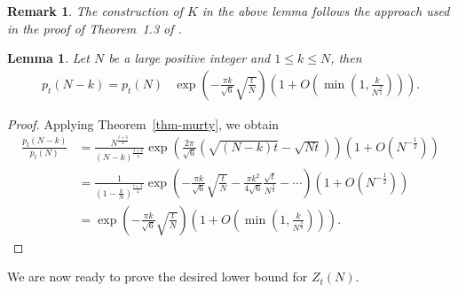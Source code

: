 \documentclass[11pt]{amsart}
\theoremstyle{plain}
\newtheorem{lemma}[theorem]{Lemma}
\newtheorem{remark}[]{Remark}
\numberwithin{equation}{section}
\begin{document}
	\begin{remark}
		The construction of $K$ in the above lemma follows the approach used in the proof of Theorem~1.3 of \cite{barman1}.
	\end{remark}
	\begin{lemma}\label{lemma-erdos0}
		Let $N$ be a large positive integer and $1\le k\le N$, then 
		\begin{align*}
			p_t(N-k)=p_t(N)&\exp\left(-\frac{\pi k}{\sqrt{6}}\sqrt{\frac{t}{N}}\right)\left(1+O\left(\min\left(1,\frac{k}{N^{\frac{3}{4}}}\right)\right)\right). 
		\end{align*}
	\end{lemma}
	\begin{proof}
		Applying Theorem~\ref{thm-murty}, we obtain
		\begin{align*}
			\frac{p_t(N-k)}{p_t(N)}&=\frac{N^{\frac{t+3}{4}}}{(N-k)^{\frac{t+3}{4}}}\exp\left(\frac{2\pi}{\sqrt{6}}\left(\sqrt{(N-k)t}-\sqrt{Nt}\right)\right)\left(1+O\left(N^{-\frac{1}{2}}\right)\right)  \\
			&=\frac{1}{\left(1-\frac{k}{N}\right)^{\frac{t+3}{4}}}\exp\left(-\frac{\pi k}{\sqrt{6}}\sqrt{\frac{t}{N}}-\frac{\pi k^{2}}{4\sqrt{6}}\frac{\sqrt{t}}{N^{\frac{3}{2}}}-\cdots\right)\left(1+O\left(N^{-\frac{1}{2}}\right)\right)\\
			&=\exp\left(-\frac{\pi k}{\sqrt{6}}\sqrt{\frac{t}{N}}\right)\left(1+O\left(\min\left(1,\frac{k}{N^{\frac{3}{4}}}\right)\right)\right).
		\end{align*}
	\end{proof}
	We are now ready to prove the desired lower bound for $Z_t(N)$.
\end{document}
